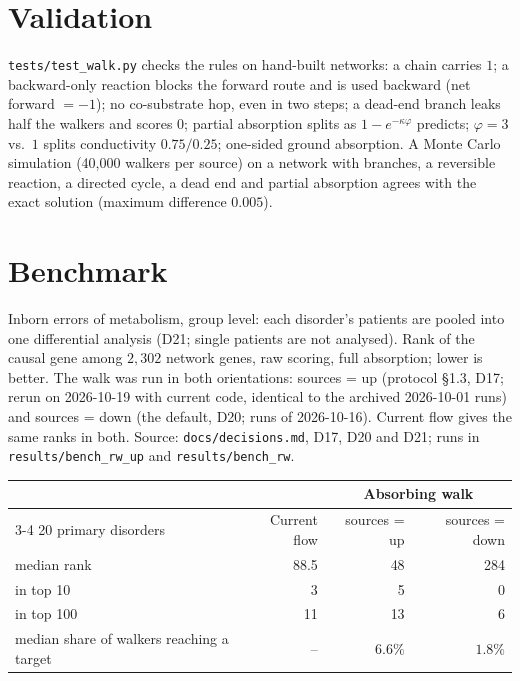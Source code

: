 \documentclass[11pt]{article}
\newcommand{\code}[1]{\texttt{#1}}
\begin{document}
\section{Validation}
\code{tests/test\_walk.py} checks the rules on hand-built networks: a chain carries
$1$; a backward-only reaction blocks the forward route and is used backward
(net forward $=-1$); no co-substrate hop, even in two steps; a dead-end branch leaks
half the walkers and scores $0$; partial absorption splits as $1-e^{-\kappa\varphi}$
predicts; $\varphi=3$ vs.\ $1$ splits conductivity $0.75/0.25$; one-sided ground
absorption. A Monte Carlo simulation (40{,}000 walkers per source) on a network with
branches, a reversible reaction, a directed cycle, a dead end and partial absorption
agrees with the exact solution (maximum difference $0.005$).

\section{Benchmark}
\label{sec:benchmark}
Inborn errors of metabolism, group level: each disorder's patients are pooled into one
differential analysis (D21; single patients are not analysed). Rank of the causal gene
among $2{,}302$ network genes, raw scoring, full absorption; lower is better. The walk
was run in both orientations: sources = up (protocol \S1.3, D17; rerun on 2026-10-19
with current code, identical to the archived 2026-10-01 runs) and sources = down (the
default, D20; runs of 2026-10-16). Current flow gives the same ranks in both. Source:
\code{docs/decisions.md}, D17, D20 and D21; runs in \code{results/bench\_rw\_up} and
\code{results/bench\_rw}.

\begin{center}
\begin{tabular}{@{}lrrr@{}}
\toprule
 & & \multicolumn{2}{c}{Absorbing walk}\\
\cmidrule(l){3-4}
20 primary disorders & Current flow & sources = up & sources = down\\
\midrule
median rank & 88.5 & 48 & 284\\
in top 10 & 3 & 5 & 0\\
in top 100 & 11 & 13 & 6\\
median share of walkers reaching a target & -- & $6.6\%$ & $1.8\%$\\
\bottomrule
\end{tabular}
\end{center}
\end{document}
